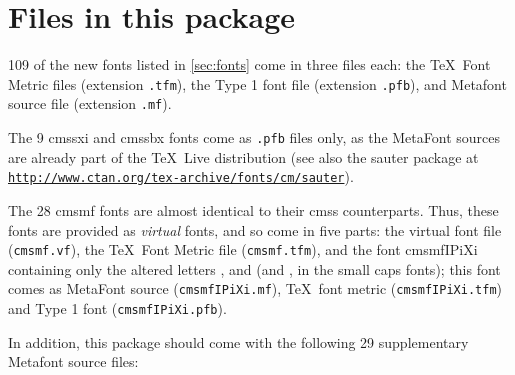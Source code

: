 \documentclass{amsart}
\begin{document}
\section{Files in this package}\label{sec:files}

109 of the new fonts listed in \autoref{sec:fonts} come in three files each: the \TeX\ Font Metric files (extension \texttt{.tfm}), the Type 1 font file (extension \texttt{.pfb}), and Metafont source file (extension \texttt{.mf}).

The 9 \textsf{cmssxi} and \textsf{cmssbx} fonts come as \texttt{.pfb} files only, as the MetaFont sources are already part of the \TeX\ Live distribution (see also the \textsf{sauter} package at \texttt{\href{http://www.ctan.org/tex-archive/fonts/cm/sauter} {http:/\slash www.ctan.org\slash tex-archive\slash fonts\slash cm\slash sauter}}).

The 28 \textsf{cmsmf} fonts are almost identical to their \textsf{cmss} counterparts. Thus, these fonts are provided as \emph{virtual} fonts, and so come in five parts: the virtual font file (\texttt{cmsmf.vf}), the \TeX\ Font Metric file (\texttt{cmsmf.tfm}), and the font \textsf{cmsmfIPiXi} containing only the altered letters ,  and  (and , in the small caps fonts); this font comes as MetaFont source (\texttt{cmsmfIPiXi.mf}), \TeX\ font metric (\texttt{cmsmfIPiXi.tfm}) and Type 1 font (\texttt{cmsmfIPiXi.pfb}).

In addition, this package should come with the following 29 supplementary Metafont source files:
\end{document}
